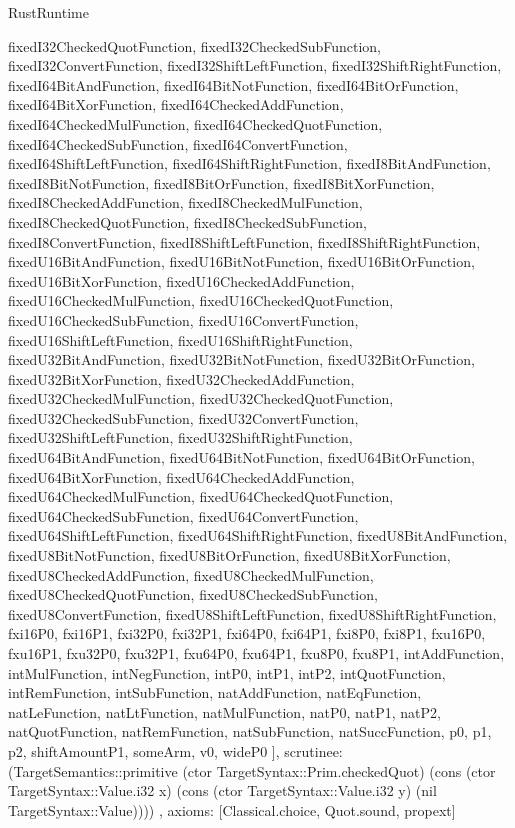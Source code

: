\begin{lexlean}{RustRuntime}
\begin{semanticmodule}
{{      fixedI32CheckedQuotFunction,
      fixedI32CheckedSubFunction,
      fixedI32ConvertFunction,
      fixedI32ShiftLeftFunction,
      fixedI32ShiftRightFunction,
      fixedI64BitAndFunction,
      fixedI64BitNotFunction,
      fixedI64BitOrFunction,
      fixedI64BitXorFunction,
      fixedI64CheckedAddFunction,
      fixedI64CheckedMulFunction,
      fixedI64CheckedQuotFunction,
      fixedI64CheckedSubFunction,
      fixedI64ConvertFunction,
      fixedI64ShiftLeftFunction,
      fixedI64ShiftRightFunction,
      fixedI8BitAndFunction,
      fixedI8BitNotFunction,
      fixedI8BitOrFunction,
      fixedI8BitXorFunction,
      fixedI8CheckedAddFunction,
      fixedI8CheckedMulFunction,
      fixedI8CheckedQuotFunction,
      fixedI8CheckedSubFunction,
      fixedI8ConvertFunction,
      fixedI8ShiftLeftFunction,
      fixedI8ShiftRightFunction,
      fixedU16BitAndFunction,
      fixedU16BitNotFunction,
      fixedU16BitOrFunction,
      fixedU16BitXorFunction,
      fixedU16CheckedAddFunction,
      fixedU16CheckedMulFunction,
      fixedU16CheckedQuotFunction,
      fixedU16CheckedSubFunction,
      fixedU16ConvertFunction,
      fixedU16ShiftLeftFunction,
      fixedU16ShiftRightFunction,
      fixedU32BitAndFunction,
      fixedU32BitNotFunction,
      fixedU32BitOrFunction,
      fixedU32BitXorFunction,
      fixedU32CheckedAddFunction,
      fixedU32CheckedMulFunction,
      fixedU32CheckedQuotFunction,
      fixedU32CheckedSubFunction,
      fixedU32ConvertFunction,
      fixedU32ShiftLeftFunction,
      fixedU32ShiftRightFunction,
      fixedU64BitAndFunction,
      fixedU64BitNotFunction,
      fixedU64BitOrFunction,
      fixedU64BitXorFunction,
      fixedU64CheckedAddFunction,
      fixedU64CheckedMulFunction,
      fixedU64CheckedQuotFunction,
      fixedU64CheckedSubFunction,
      fixedU64ConvertFunction,
      fixedU64ShiftLeftFunction,
      fixedU64ShiftRightFunction,
      fixedU8BitAndFunction,
      fixedU8BitNotFunction,
      fixedU8BitOrFunction,
      fixedU8BitXorFunction,
      fixedU8CheckedAddFunction,
      fixedU8CheckedMulFunction,
      fixedU8CheckedQuotFunction,
      fixedU8CheckedSubFunction,
      fixedU8ConvertFunction,
      fixedU8ShiftLeftFunction,
      fixedU8ShiftRightFunction,
      fxi16P0,
      fxi16P1,
      fxi32P0,
      fxi32P1,
      fxi64P0,
      fxi64P1,
      fxi8P0,
      fxi8P1,
      fxu16P0,
      fxu16P1,
      fxu32P0,
      fxu32P1,
      fxu64P0,
      fxu64P1,
      fxu8P0,
      fxu8P1,
      intAddFunction,
      intMulFunction,
      intNegFunction,
      intP0,
      intP1,
      intP2,
      intQuotFunction,
      intRemFunction,
      intSubFunction,
      natAddFunction,
      natEqFunction,
      natLeFunction,
      natLtFunction,
      natMulFunction,
      natP0,
      natP1,
      natP2,
      natQuotFunction,
      natRemFunction,
      natSubFunction,
      natSuccFunction,
      p0,
      p1,
      p2,
      shiftAmountP1,
      someArm,
      v0,
      wideP0
    ],
    scrutinee: (TargetSemantics::primitive (ctor TargetSyntax::Prim.checkedQuot) (cons (ctor TargetSyntax::Value.i32 x) (cons (ctor TargetSyntax::Value.i32 y) (nil TargetSyntax::Value))))
  },
  axioms: [Classical.choice, Quot.sound, propext]
}


\end{semanticmodule}
\end{lexlean}
